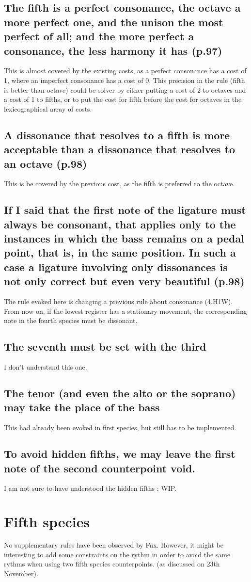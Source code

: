 \subsection{The fifth is a perfect consonance, the octave a more perfect one, and the unison the most perfect of all; and the more perfect a consonance, the less harmony it has (p.97)}
This is almost covered by the existing costs, as a perfect consonance has a cost of 1, where an imperfect consonance has a cost of 0. This precision in the rule (fifth is better than octave) could be solver by either putting a cost of 2 to octaves and a cost of 1 to fifths, or to put the cost for fifth before the cost for octaves in the lexicographical array of costs.
\subsection{A dissonance that resolves to a fifth is more acceptable than a dissonance that resolves to an octave (p.98)}
This is be covered by the previous cost, as the fifth is preferred to the octave.

\subsection{If I said that the first note of the ligature must always be consonant, that applies only to the instances in which the bass remains on a pedal point, that is, in the same position. In such a case a ligature involving only dissonances is not only correct but even very beautiful (p.98)}
The rule evoked here is changing a previous rule about consonance (4.H1W). From now on, if the lowest register has a stationary movement, the corresponding note in the fourth species must be dissonant.


\subsection{The seventh must be set with the third}
I don't understand this one.

\subsection{The tenor (and even the alto or the soprano) may take the place of the bass}
This had already been evoked in first species, but still has to be implemented.

\subsection{To avoid hidden fifths, we may leave the first note of the second counterpoint void.}
I am not sure to have understood the hidden fifths : WIP.

\section{Fifth species}
No supplementary rules have been observed by Fux. However, it might be interesting to add some constraints on the rythm in order to avoid the same rythms when using two fifth species counterpoints. (as discussed on 23th November).
